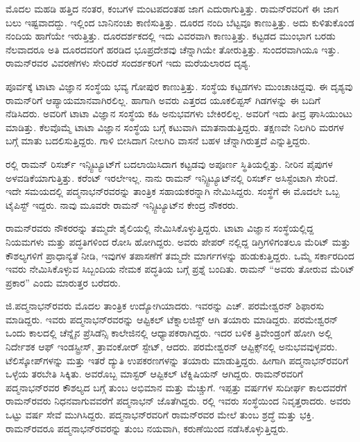 ಮೊದಲ ಮಹಡಿ ಹತ್ತಿದ ನಂತರ, ಕಂಬಗಳ ಮಂಟಪದಂತಹ ಜಾಗ ಎದುರಾಗುತ್ತಿತ್ತು. ರಾಮನ್‍ರವರಿಗೆ ಈ ಜಾಗ ಬಲು ಇಷ್ಟವಾದದ್ದು. ಇಲ್ಲಿಂದ ಬಾನಿನಂಚು ಕಾಣಿಸುತ್ತಿತ್ತು. ದೂರದ ನಂದಿ ಬೆಟ್ಟವೂ ಕಾಣುತ್ತಿತ್ತು. ಅದು ಕುಳಿತುಕೊಂಡ ನಂದಿಯ ಹಾಗೆಯೇ ಇರುತ್ತಿತ್ತು. ದೂರದರ್ಶಕದಲ್ಲಿ ಇದು ವಿವರವಾಗಿ ಕಾಣುತ್ತಿತ್ತು. ಕಟ್ಟಡದ ಮುಂಭಾಗ ಬರಡು ನೆಲವಾದರೂ ಅತಿ ದೂರದವರಿಗೆ ಹರಡಿದ ಭೂಪ್ರದೇಶವು ಚೆನ್ನಾಗಿಯೇ ತೋರುತ್ತಿತ್ತು. ಸುಂದರವಾಗಿಯೂ ಇತ್ತು. ರಾಮನ್‍ರವರ ವಿವರಣೆಗಳು ಸೇರಿದರೆ ಸಂದರ್ಶಕರಿಗೆ ಇದು ಮರೆಯಲಾರದ ದೃಶ್ಯ.

ಪೂರ್ವಕ್ಕೆ ಟಾಟಾ ವಿಜ್ಞಾನ ಸಂಸ್ಥೆಯ ಭವ್ಯ ಗೋಪುರ ಕಾಣುತ್ತಿತ್ತು. ಸಂಸ್ಥೆಯ ಕಟ್ಟಡಗಳು ಮುಂಚಾಚಿದ್ದವು. ಈ ದೃಶ್ಯವು ರಾಮನ್‍ರಿಗೆ ಆಪ್ಯಾಯಮಾನವಾಗಿರಲಿಲ್ಲ. ಹಾಗಾಗಿ ಅವರು ಎತ್ತರದ ಯೂಕಲಿಪ್ಟಸ್ ಗಿಡಗಳನ್ನು ಈ ಬದಿಗೆ ನೆಡಿಸಿದರು. ಅವರಿಗೆ ಟಾಟಾ ವಿಜ್ಞಾನ ಸಂಸ್ಥೆಯ ಕಹಿ ಅನುಭವಗಳು ಬೇಕಿರಲಿಲ್ಲ. ಅವರಿಗೆ ಇದು ತೀವ್ರ ಘಾಸಿಯುಂಟು ಮಾಡಿತ್ತು. ಕೆಲವೊಮ್ಮೆ ಟಾಟಾ ವಿಜ್ಞಾನ ಸಂಸ್ಥೆಯ ಬಗ್ಗೆ ಕಟುವಾಗಿ ಮಾತನಾಡುತ್ತಿದ್ದರು. ತಕ್ಷಣವೇ ನಿಲಗಿರಿ ಮರಗಳ ಬಗ್ಗೆ ಮಾತು ಬದಲಿಸುತ್ತಿದ್ದರು. ಗಾಳಿ ಬೀಸಿದಾಗ ನೀಲಗಿರಿ ವಾಸನೆ ಬಹಳ ಚೆನ್ನಾಗಿರುತ್ತದೆ ಎನ್ನುತ್ತಿದ್ದರು.

ರಲ್ಲಿ ರಾಮನ್ ರಿಸರ್ಚ್ ಇನ್ಸ್ಟಿಟ್ಯೂಟ್‍ಗೆ ಬದಲಾಯಿಸಿದಾಗ ಕಟ್ಟಡವು ಅಪೂರ್ಣ ಸ್ಥಿತಿಯಲ್ಲಿತ್ತು. ನೀರಿನ ಪೈಪುಗಳ ಅಳವಡಿಕೆಯಾಗುತ್ತಿತ್ತು. ಕರೆಂಟ್ ಇರಲೇಇಲ್ಲ. ನಾನು ರಾಮನ್ ಇನ್ಸ್ಟಿಟ್ಯೂಟ್‍ನಲ್ಲಿ ರಿಸರ್ಚ್ ಅಸಿಸ್ಟೆಂಟಾಗಿ ಸೇರಿದೆ. ಇದೇ ಸಮಯದಲ್ಲಿ ಪದ್ಮನಾಭನ್‍ರವರನ್ನು ತಾಂತ್ರಿಕ ಸಹಾಯಕರನ್ನಾಗಿ ನೇಮಿಸಿದ್ದರು. ಸಂಸ್ಥೆಗೆ ಈ ಮೊದಲೇ ಒಬ್ಬ ಟೈಪಿಸ್ಟ್ ಇದ್ದರು. ನಾವು ಮೂವರೇ ರಾಮನ್ ಇನ್ಸ್ಟಿಟ್ಯೂಟ್‍ನ ಕೇಂದ್ರ ನೌಕರರು.

ರಾಮನ್‍ರವರು ನೌಕರರನ್ನು ತಮ್ಮದೇ ಶೈಲಿಯಲ್ಲಿ ನೇಮಿಸಿಕೊಳ್ಳುತ್ತಿದ್ದರು. ಟಾಟಾ ವಿಜ್ಞಾನ ಸಂಸ್ಥೆಯಲ್ಲಿದ್ದ ನಿಯಮಗಳು ಮತ್ತು ಪದ್ಧತಿಗಳಿಂದ ರೋಸಿ ಹೋಗಿದ್ದರು. ಅವರು ಪೇಪರ್ ನಲ್ಲಿದ್ದ ಡಿಗ್ರಿಗಳಿಗಂತಲೂ ಮೆರಿಟ್ ಮತ್ತು ಕೌಶಲ್ಯಗಳಿಗೆ ಪ್ರಾಧಾನ್ಯತೆ ನೀಡಿ, ಇವುಗಳ ತಪಾಸಣೆಗೆ ತಮ್ಮದೇ ಮಾರ್ಗಗಳನ್ನು ಹುಡುಕುತ್ತಿದ್ದರು. ಒಮ್ಮೆ ಸರ್ಕಾರದಿಂದ ಇವರು ನೇಮಿಸಿಕೊಳ್ಳುವ ಸಿಬ್ಬಂದಿಯ ನೇಮಕ ಪದ್ಧತಿಯ ಬಗ್ಗೆ ಪ್ರಶ್ನೆ ಬಂದಿತು. ರಾಮನ್ \enginline{-} “ಅವರು ತೋರುವ ಮೆರಿಟ್ ಪ್ರಕಾರ” ಎಂದು ಮಾರುತ್ತರ ಬರೆದರು.

ಜಿ.ಪದ್ಮನಾಭನ್‍ರವರು ಮೊದಲ ತಾಂತ್ರಿಕ ಉದ್ಯೋಗಿಯಾದರು. ಇವರನ್ನು ಎಚ್. ಪರಮೇಶ್ವರನ್ ಶಿಫಾರಸು ಮಾಡಿದ್ದರು. ಇವರು ಪದ್ಮನಾಭನ್‍ರವರನ್ನು ಆಪ್ಟಿಕಲ್ ಟೆಕ್ನಾಲಜಿಸ್ಟ್ ಆಗಿ ತಯಾರು ಮಾಡಿದ್ದರು. ಪರಮೇಶ್ವರನ್ ಒಂದು ಕಾಲದಲ್ಲಿ ಚೆನ್ನೈನ ಪ್ರೆಸಿಡೆನ್ಸಿ ಕಾಲೇಜಿನಲ್ಲಿ ಆಧ್ಯಾಪಕರಾಗಿದ್ದರು. ಇದರ ಬಳಿಕ ತ್ರಿವೇಂಡ್ರಂಗೆ ಹೋಗಿ ಅಲ್ಲಿ ನಿರ್ದೇಶಕ ಆಫ್ ಇಂಡಸ್ಟ್ರೀಸ್, ತ್ರಾವಂಕೋರ್ ಸ್ಟೇಟ್, ಆದರು. ಪರಮೇಶ್ವರನ್ ಆಪ್ಟಿಕ್ಸ್‌ನಲ್ಲಿ ಅನುಭವವುಳ್ಳವರು. ಟೆಲಿಸ್ಕೋಪ್‍ಗಳನ್ನು ಮತ್ತು ಇತರೆ ದ್ಯುತಿ ಉಪಕರಣಗಳನ್ನು ತಯಾರು ಮಾಡುತ್ತಿದ್ದರು. ಹೀಗಾಗಿ ಪದ್ಮನಾಭನ್‍ರವರಿಗೆ ಒಳ್ಳೆಯ ತರಬೇತಿ ಸಿಕ್ಕಿತು. ಅವರೊಬ್ಬ ಮಾಸ್ಟರ್ ಆಪ್ಟಿಕಲ್ ಟೆಕ್ನಿಷಿಯನ್ ಆಗಿದ್ದರು. ರಾಮನ್‍ರವರಿಗೆ ಪದ್ಮನಾಭನ್‍ರವರ ಕೌಶಲ್ಯದ ಬಗ್ಗೆ ತುಂಬ ಅಭಿಮಾನ ಮತ್ತು ಮೆಚ್ಚುಗೆ. ಇಪ್ಪತ್ತು ವರ್ಷಗಳ ಸುದೀರ್ಘ ಕಾಲದವರೆಗೆ ರಾಮನ್‍ರವರು ನಿಧನವಾಗುವವರೆಗೆ ಪದ್ಮನಾಭನ್ ಜೊತೆಗಿದ್ದರು. ರಲ್ಲಿ ಇವರು ಸಂಸ್ಥೆಯಿಂದ ನಿವೃತ್ತರಾದರು. ಅವರು ಒಟ್ಟು  ವರ್ಷ ಸೇವೆ ಮುಗಿಸಿದ್ದರು. ಪದ್ಮನಾಭನ್‍ರವರಿಗೆ ರಾಮನ್‍ರವರ ಮೇಲೆ ತುಂಬ ಶ್ರದ್ಧೆ ಮತ್ತು ಭಕ್ತಿ. ರಾಮನ್‍ರವರೂ ಪದ್ಮನಾಭನ್‍ರವರನ್ನು ತುಂಬ ನಯವಾಗಿ, ಕರುಣೆಯಿಂದ ನಡೆಸಿಕೊಳ್ಳುತ್ತಿದ್ದರು.

